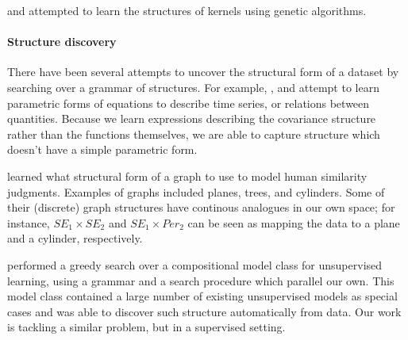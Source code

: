 \documentclass[twoside]{article}
\begin{document}
\citet{diosan2007evolving} and \citet{bing2010gp} attempted to learn the structures of kernels using genetic algorithms.  


\paragraph{Structure discovery}

There have been several attempts to uncover the structural form of a dataset by searching over a grammar of structures. For example, \cite{schmidt2009distilling}, \cite{todorovski1997declarative} and \cite{washio1999discovering} attempt to learn parametric forms of equations to describe time series, or relations between quantities. Because we learn expressions describing the covariance structure rather than the functions themselves, we are able to capture structure which doesn't have a simple parametric form.

\citet{kemp2008discovery} learned what structural form of a graph to use to model human similarity judgments. Examples of graphs included planes, trees, and cylinders. Some of their (discrete) graph structures have continous analogues in our own space; for instance, $SE_1 \times SE_2$ and $SE_1 \times Per_2$ can be seen as mapping the data to a plane and a cylinder, respectively.

\citet{grosse2012exploiting} performed a greedy search over a compositional model class for unsupervised learning, using a grammar and a search procedure which parallel our own. This model class contained a large number of existing unsupervised models as special cases and was able to discover such structure automatically from data. Our work is tackling a similar problem, but in a supervised setting.




%
\end{document}
